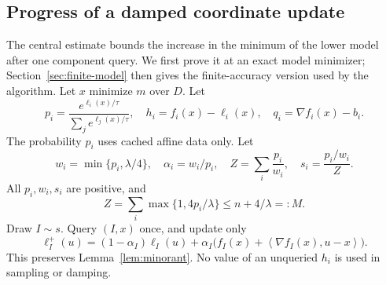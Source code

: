 \documentclass[11pt,a4paper]{article}
\theoremstyle{definition}\newtheorem{definition}[theorem]{Definition}
\theoremstyle{remark}\newtheorem{remark}[theorem]{Remark}
\newcommand{\ip}[2]{\left\langle#1,#2\right\rangle}
\begin{document}
\subsection{Progress of a damped coordinate update}
The central estimate bounds the increase in the minimum of the lower model
after one component query. We first prove it at an exact model minimizer;
Section~\ref{sec:finite-model} then gives the finite-accuracy version used
by the algorithm. Let $x$ minimize $m$ over $D$. Let
\[
 p_i=\frac{e^{\ell_i(x)/\tau}}{\sum_j e^{\ell_j(x)/\tau}},\quad
 h_i=f_i(x)-\ell_i(x),\quad
 q_i=\nabla f_i(x)-b_i.
\]
The probability $p_i$ uses cached affine data only. Let
\begin{equation}\label{eq:weightslocal}
 w_i=\min\{p_i,\lambda/4\},\quad
 \alpha_i=w_i/p_i,\quad
 Z=\sum_i\frac{p_i}{w_i},\quad
 s_i=\frac{p_i/w_i}{Z}.
\end{equation}
All $p_i,w_i,s_i$ are positive, and
\begin{equation}\label{eq:Z}
 Z=\sum_i\max\{1,4p_i/\lambda\}\le n+4/\lambda=:M.
\end{equation}
Draw $I\sim s$. Query $(I,x)$ once, and update only
\begin{equation}\label{eq:update}
 \ell_I^+(u)=(1-\alpha_I)\ell_I(u)
   +\alpha_I\bigl(f_I(x)+\ip{\nabla f_I(x)}{u-x}\bigr).
\end{equation}
This preserves Lemma~\ref{lem:minorant}. No value of an unqueried $h_i$ is used in sampling or damping.
\end{document}
